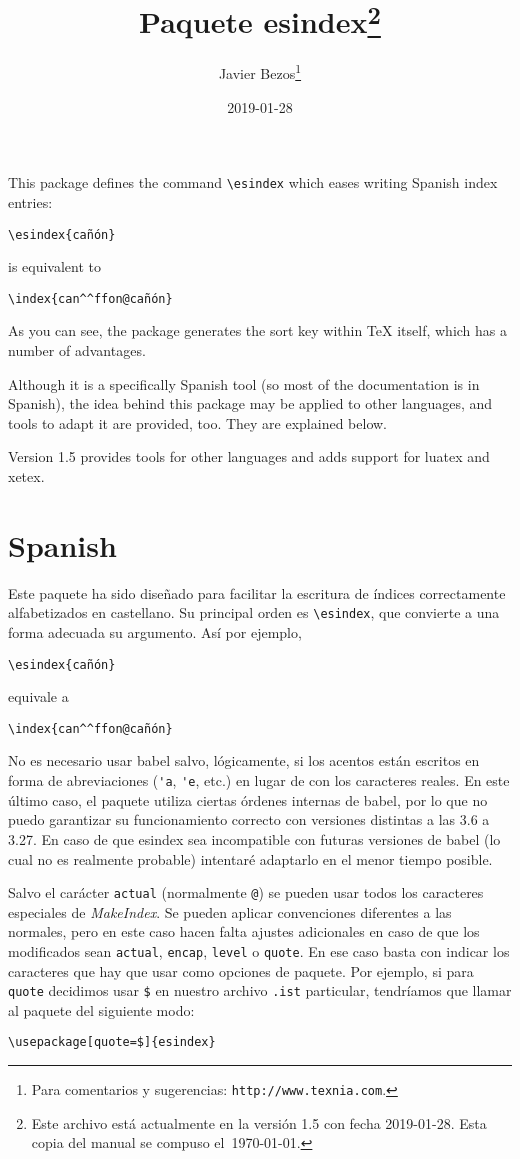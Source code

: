 \documentclass{article}
\title{Paquete \textsf{esindex}\footnote{Este
     archivo est\'a actualmente en la versión 1.5
     con fecha 2019-01-28.
     Esta copia del manual se compuso el~\today.}}
\author{Javier Bezos\footnote{Para comentarios y sugerencias: 
\texttt{http://www.texnia.com}.}}
\date{2019-01-28}
\begin{document}
\maketitle

This package defines the command \verb|\esindex| which eases writing
Spanish index entries:
\begin{verbatim}
\esindex{cañón}
\end{verbatim}
is equivalent to
\begin{verbatim}
\index{can^^ffon@cañón}
\end{verbatim}
As you can see, the package generates the sort key within \TeX{}
itself, which has a number of advantages.

Although it is a specifically Spanish tool (so most of the
documentation is in Spanish), the idea behind this package may be
applied to other languages, and tools to adapt it are provided, too.
They are explained below.

Version 1.5 provides tools for other languages and adds support for
\textsf{luatex} and \textsf{xetex}.

\section{Spanish}

Este paquete ha sido diseñado para facilitar la escritura de índices
correctamente alfabetizados en castellano. Su principal orden es
\verb|\esindex|, que convierte a una forma adecuada su argumento. Así
por ejemplo,
\begin{verbatim}
\esindex{cañón}
\end{verbatim}
equivale a
\begin{verbatim}
\index{can^^ffon@cañón}
\end{verbatim}
No es necesario usar \textsf{babel} salvo, lógicamente, si los acentos
están escritos en forma de abreviaciones (\verb|'a|, \verb|'e|, etc.)
en lugar de con los caracteres reales. En este último caso, el paquete
utiliza ciertas órdenes internas de \textsf{babel}, por lo que no puedo
garantizar su funcionamiento correcto con versiones distintas a las 3.6
a 3.27. En caso de que \textsf{esindex} sea incompatible con futuras
versiones de \textsf{babel} (lo cual no es realmente probable)
intentaré adaptarlo en el menor tiempo posible.

Salvo el carácter \verb|actual| (normalmente \verb|@|) se pueden usar
todos los caracteres especiales de \textit{MakeIndex}. Se pueden
aplicar convenciones diferentes a las normales, pero en este caso hacen
falta ajustes adicionales en caso de que los modificados sean
\verb|actual|, \verb|encap|, \verb|level| o \verb|quote|. En ese caso
basta con indicar los caracteres que hay que usar como opciones de
paquete. Por ejemplo, si para \verb|quote| decidimos usar \verb|$| en
nuestro archivo \verb|.ist| particular, tendríamos que llamar al
paquete del siguiente modo:
\begin{verbatim}
\usepackage[quote=$]{esindex}
\end{verbatim}
\end{document}
